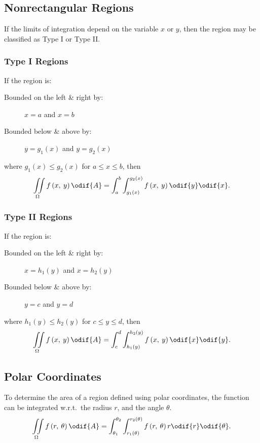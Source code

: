 \documentclass{article}
\begin{document}
\subsection{Nonrectangular Regions}
If the limits of integration depend on the variable \(x\) or \(y\),
then the region may be classified as Type I or Type II\@.
\subsubsection{Type I Regions}
If the region is:
\begin{description}
    \item[Bounded on the left \& right by:] \(x=a\) and \(x=b\)
    \item[Bounded below \& above by:] \(y=g_1\left( x \right)\) and
          \(y=g_2\left( x \right)\)
\end{description}
where \(g_1\left( x \right) \leq g_2\left( x \right)\) for \(a \leq x \leq b\), then
\begin{equation*}
    \iint\limits_{\Omega} f\left( x,\: y \right) \odif{A} = \int_a^b\int_{g_1\left( x \right)}^{g_2\left( x \right)} f\left( x,\: y \right) \odif{y} \odif{x}.
\end{equation*}
\subsubsection{Type II Regions}
If the region is:
\begin{description}
    \item[Bounded on the left \& right by:] \(x=h_1\left( y \right)\)
          and \(x=h_2\left( y \right)\)
    \item[Bounded below \& above by:] \(y=c\) and \(y=d\)
\end{description}
where \(h_1\left( y \right) \leq h_2\left( y \right)\) for \(c \leq y \leq d\), then
\begin{equation*}
    \iint\limits_{\Omega} f\left( x,\: y \right) \odif{A} = \int_c^d\int_{h_1\left( y \right)}^{h_2\left( y \right)} f\left( x,\: y \right) \odif{x} \odif{y}.
\end{equation*}
\subsection{Polar Coordinates}
To determine the area of a region defined using polar coordinates, the
function can be integrated w.r.t.\ the radius \(r\), and the angle
\(\theta\).
\begin{equation*}
    \iint\limits_{\Omega} f\left( r,\: \theta \right) \odif{A} = \int_{\theta_1}^{\theta_2}\int_{r_1\left( \theta \right)}^{r_2\left( \theta \right)} f\left(r,\: \theta\right) r \odif{r} \odif{\theta}.
\end{equation*}
\end{document}
